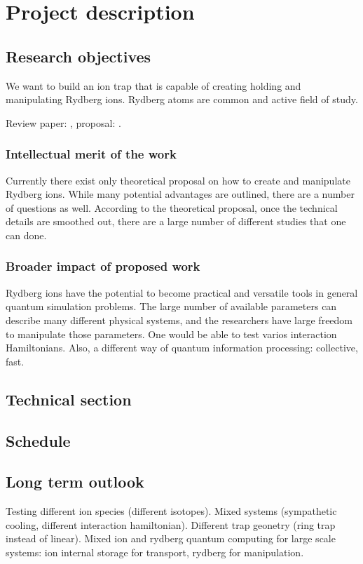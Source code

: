 \section{Project description}

\subsection{Research objectives}

We want to build an ion trap that is capable of creating holding and manipulating Rydberg ions. Rydberg atoms are common and active field of study. 

Review paper: \cite{Saffman2010}, proposal: \cite{Mueller2008}.

\subsubsection{Intellectual merit of the work}

Currently there exist only theoretical proposal on how to create and manipulate Rydberg ions. While many potential advantages are outlined, there are a number of questions as well. According to the theoretical proposal, once the technical details are smoothed out, there are a large number of different studies that one can done.

\subsubsection{Broader impact of proposed work}

Rydberg ions have the potential to become practical and versatile tools in general quantum simulation problems. The large number of available parameters can describe many different physical systems, and the researchers have large freedom to manipulate those parameters. One would be able to test varios interaction Hamiltonians. Also, a different way of quantum information processing: collective, fast.

\subsection{Technical section}

\subsection{Schedule}

\subsection{Long term outlook}

Testing different ion species (different isotopes). Mixed systems (sympathetic cooling, different interaction hamiltonian). Different trap geonetry (ring trap instead of linear). Mixed ion and rydberg quantum computing for large scale systems: ion internal storage for transport, rydberg for manipulation.
